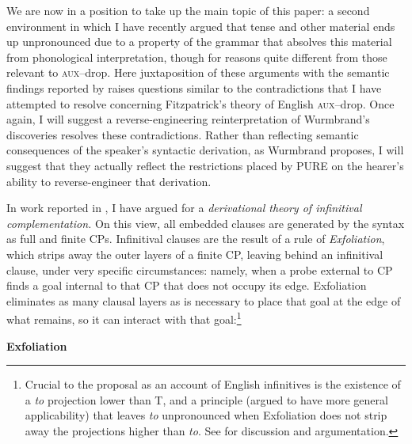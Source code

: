 \documentclass[output=paper]{langscibook}
\begin{document}
We are now in a position to take up the main topic of this paper: a second environment in which I have recently argued that tense and other material ends up unpronounced due to a property of the grammar that absolves this material from phonological interpretation, though for reasons quite different from those relevant to \textsc{aux}--drop. Here juxtaposition of these arguments with the semantic findings reported by \citet{Wurmbrand:2014aa} raises questions similar to the contradictions that I have attempted to resolve concerning Fitzpatrick's theory of English \textsc{aux}--drop. Once again, I will suggest a reverse-engineering reinterpretation of Wurmbrand's discoveries resolves these contradictions. Rather than reflecting semantic consequences of the speaker's syntactic derivation, as Wurmbrand proposes, I will suggest that they actually reflect the restrictions placed by PURE on the hearer's ability to reverse-engineer that derivation.

In work reported in \citet{Pesetsky:2019aa}, I have argued for a \textit{derivational theory of infinitival complementation.} On this view, all embedded clauses are generated by the syntax as full and finite CPs. Infinitival clauses are the result of a rule of \textit{Exfoliation}, which strips away the outer layers of a finite CP, leaving behind an infinitival clause, under very specific circumstances: namely, when a probe external to CP finds a goal internal to that CP that does not occupy its edge. Exfoliation eliminates as many clausal layers as is necessary to place that goal at the edge of what remains, so it can interact with that goal:\footnote{Crucial to the proposal as an account of English infinitives is the existence of a \textit{to }projection lower than T, and a principle (argued to have more general applicability) that leaves \textit{to }unpronounced when Exfoliation does not strip away the projections higher than \textit{to}. See \citet{Pesetsky:2019aa} for discussion and argumentation.}

\pex 
\textbf{Exfoliation} \\
\xe
\end{document}
